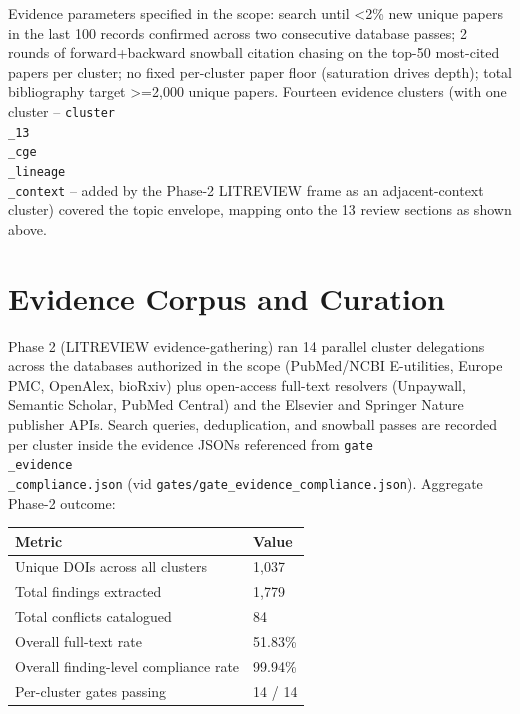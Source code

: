 \documentclass[11pt]{article}
\begin{document}
Evidence parameters specified in the scope: search until \textless 2\% new unique papers in the last 100 records confirmed across two consecutive database passes; 2 rounds of forward+backward snowball citation chasing on the top-50 most-cited papers per cluster; no fixed per-cluster paper floor (saturation drives depth); total bibliography target \textgreater =2,000 unique papers. Fourteen evidence clusters (with one cluster -- \texttt{cluster\\_13\\_cge\\_lineage\\_context} -- added by the Phase-2 LITREVIEW frame as an adjacent-context cluster) covered the topic envelope, mapping onto the 13 review sections as shown above.

\section{Evidence Corpus and Curation}\label{sec-methods-evidence}

Phase 2 (LITREVIEW evidence-gathering) ran 14 parallel cluster delegations across the databases authorized in the scope (PubMed/NCBI E-utilities, Europe PMC, OpenAlex, bioRxiv) plus open-access full-text resolvers (Unpaywall, Semantic Scholar, PubMed Central) and the Elsevier and Springer Nature publisher APIs. Search queries, deduplication, and snowball passes are recorded per cluster inside the evidence JSONs referenced from \texttt{gate\\_evidence\\_compliance.json} (vid \texttt{gates/gate\_evidence\_compliance.json}). Aggregate Phase-2 outcome:

\bigskip\noindent
\begin{tabular}{p{}p{}}
\toprule
Metric & Value \\
\hline
Unique DOIs across all clusters & 1,037 \\
Total findings extracted & 1,779 \\
Total conflicts catalogued & 84 \\
Overall full-text rate & 51.83\% \\
Overall finding-level compliance rate & 99.94\% \\
Per-cluster gates passing & 14 / 14 \\
\bottomrule
\end{tabular}

\bigskip
\end{document}
